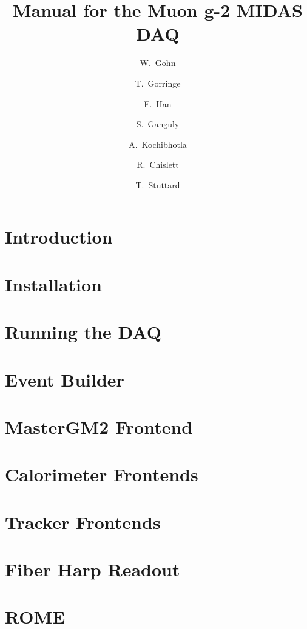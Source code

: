 \documentclass[11pt]{article}
\title{Manual for the Muon g-2 MIDAS DAQ}
\author{W.~Gohn}
\author{T.~Gorringe}
\author{F.~Han}
\affil{University of Kentucky}
\author{S.~Ganguly}
\author{A.~Kochibhotla}
\affil{University of Illinois}
\author{R.~Chislett}
\author{T.~Stuttard}
\affil{University College London}
\begin{document}
\maketitle

\tableofcontents

\newpage

\section{Introduction}

\section{Installation}



\section{Running the DAQ}



\section{Event Builder}



\section{MasterGM2 Frontend}



\section{Calorimeter Frontends}



\section{Tracker Frontends}



\section{Fiber Harp Readout}



\section{ROME}
\end{document}

